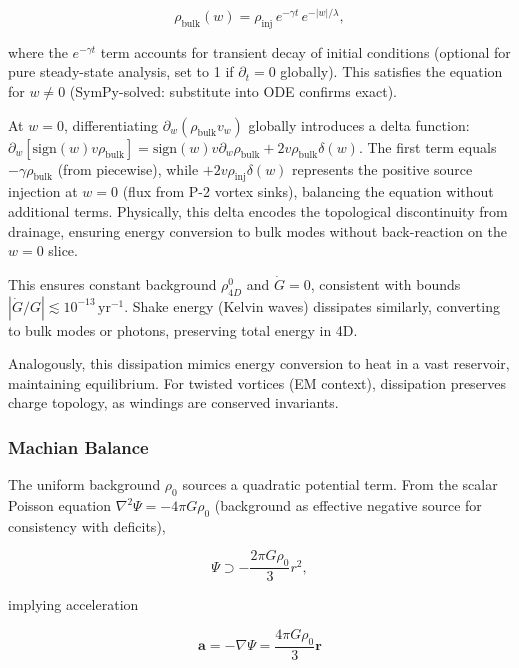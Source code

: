 \begin{equation}
\rho_{\text{bulk}}(w) = \rho_{\text{inj}} \, e^{-\gamma t} \, e^{-|w| / \lambda},
\end{equation}

where the $e^{-\gamma t}$ term accounts for transient decay of initial conditions (optional for pure steady-state analysis, set to 1 if $\partial_t = 0$ globally). This satisfies the equation for $w \neq 0$ (SymPy-solved: substitute into ODE confirms exact).

At $w=0$, differentiating $\partial_w (\rho_{\text{bulk}} v_w)$ globally introduces a delta function: $\partial_w [\text{sign}(w) v \rho_{\text{bulk}}] = \text{sign}(w) v \partial_w \rho_{\text{bulk}} + 2 v \rho_{\text{bulk}} \delta(w)$. The first term equals $-\gamma \rho_{\text{bulk}}$ (from piecewise), while $+2 v \rho_{\text{inj}} \delta(w)$ represents the positive source injection at $w=0$ (flux from P-2 vortex sinks), balancing the equation without additional terms. Physically, this delta encodes the topological discontinuity from drainage, ensuring energy conversion to bulk modes without back-reaction on the $w=0$ slice.

This ensures constant background $\rho_{4D}^0$ and $\dot{G} = 0$, consistent with bounds $|\dot{G}/G| \lesssim 10^{-13} \, \mathrm{yr}^{-1}$. Shake energy (Kelvin waves) dissipates similarly, converting to bulk modes or photons, preserving total energy in 4D.

Analogously, this dissipation mimics energy conversion to heat in a vast reservoir, maintaining equilibrium. For twisted vortices (EM context), dissipation preserves charge topology, as windings are conserved invariants.

\subsubsection{Machian Balance}
The uniform background $\rho_0$ sources a quadratic potential term. From the scalar Poisson equation $\nabla^2 \Psi = -4\pi G \rho_0$ (background as effective negative source for consistency with deficits),

\begin{equation}
\Psi \supset -\frac{2\pi G \rho_0}{3} r^2,
\end{equation}

implying acceleration

\begin{equation}
\mathbf{a} = -\nabla \Psi = \frac{4\pi G \rho_0}{3} \mathbf{r}
\end{equation}

